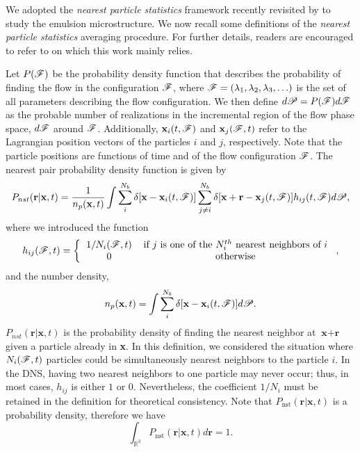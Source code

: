 
We adopted the \textit{nearest particle statistics} framework recently revisited by \citet{zhang2021ensemble} to study the emulsion microstructure.
We now recall some definitions of the \textit{nearest particle statistics} averaging procedure. 
For further details, readers are encouraged to refer to \citet{zhang2021ensemble,zhang2023evolution} on which this work mainly relies.

Let $P(\mathscr{F})$ be the probability density function that describes the probability of finding the flow in the configuration $\mathscr{F}$, where $\mathscr{F} = (\lambda_1,\lambda_2,\lambda_3,\ldots)$ is the set of all parameters describing the flow configuration.
We then define $d\mathscr{P} = P(\mathscr{F})d\mathscr{F}$ as the probable number of realizations in the incremental region of the flow phase space, $d\mathscr{F}$ around $\mathscr{F}$.
Additionally,  $\textbf{x}_i(t,\mathscr{F})$ and $\textbf{x}_j(\mathscr{F},t)$ refer to the Lagrangian position vectors of the particles $i$ and $j$, respectively. 
Note that the particle positions are functions of time and of the flow configuration $\mathscr{F}$. 
The nearest pair probability density function is given by \citep{zhang2021ensemble,zhang2023evolution}
\begin{equation}
    P_{nst}(\textbf{r}|\textbf{x},t)= \frac{1}{n_p(\textbf{x},t)}
    \int \sum_{i}^{N_b}\delta[\textbf{x}-\textbf{x}_i(t,\mathscr{F})]
    \sum_{j\neq i}^{N_b}\delta[\textbf{x}+\textbf{r}-\textbf{x}_j(t,\mathscr{F})]
    h_{ij} (t,\mathscr{F})
    d\mathscr{P},
    \label{eq:P_nstij}
\end{equation}
where we introduced the function 
\begin{equation*}
    h_{ij}(\FF,t)
    = \left\{
        \begin{tabular}{cc}
            $1/N_i(\FF,t)$ & if $j$ is one of the $N^{th}_i$ nearest neighbors of $i$ \\
            0& otherwise
        \end{tabular}
        \right. ,
\end{equation*}
and the number density, 
\begin{equation}
    n_p(\textbf{x},t)= 
    \int \sum_{i}^{N_b}\delta[\textbf{x}-\textbf{x}_i(t,\mathscr{F})] d\mathscr{P}.
    \label{eq:n_p}
\end{equation}
$P_{nst}(\textbf{r}|\textbf{x},t)$ is the probability density of finding the nearest neighbor at $\textbf{x}+\textbf{r}$ given a particle already in \textbf{x}.
In this definition, we considered the situation where $N_i(\mathscr{F},t)$ particles could be simultaneously nearest neighbors to the particle $i$. 
In the DNS, having two nearest neighbors to one particle may never occur; thus, in most cases, $h_{ij}$ is either $1$ or $0$. 
Nevertheless, the coefficient $1/N_i$ must be retained in the definition for theoretical consistency.
Note that $P_\text{nst}(\textbf{r}|\textbf{x},t)$ is a probability density, therefore we have
\begin{equation*}
    \int_{\mathbb{R}^3}
     P_\text{nst}(\textbf{r}|\textbf{x},t) d\textbf{r}  = 1. 
    \label{eq:Pnst}
\end{equation*}



